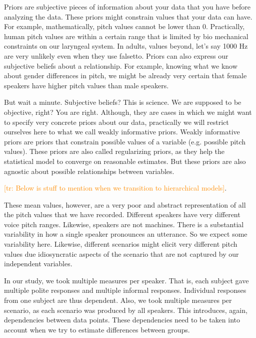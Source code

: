 \documentclass[nobib]{tufte-handout}
\newcommand{\tr}[1]{\textcolor{DarkOrange}{[tr: #1]}}
\begin{document}
Priors are subjective pieces of information about your data that you have before analyzing the data. These priors might constrain values that your data can have. For example, mathematically, pitch values  cannot be lower than 0. Practically, human pitch values are within a certain range that is limited by bio mechanical constraints on our laryngeal system. In adults, values beyond, let's say 1000 Hz are very unlikely even when they use falsetto.
Priors can also express our subjective beliefs about a relationship. For example, knowing what we know about gender differences in pitch, we might be already very certain that female speakers have higher pitch values than male speakers.

But wait a minute. Subjective beliefs? This is science. We are supposed to be objective, right? You are right. Although, they are cases in which we might want to specify very concrete priors about our data, practically we will restrict ourselves here to what we call weakly informative priors. Weakly informative priors are priors that constrain possible values of a variable (e.g. possible pitch values). These priors are also called regularizing priors, as they help the statistical model to converge on reasonable estimates. But these priors are also agnostic about possible relationships between variables. 



\tr{Below is stuff to mention when we transition to hierarchical models}. 

These mean values, however, are a very poor and abstract representation of all the pitch values that we have recorded. Different speakers have very different voice pitch ranges. Likewise, speakers are not machines. There is a substantial variability in how a single speaker pronounces an utterance. So we expect some variability here. Likewise,
different scenarios might elicit very different pitch values due idiosyncratic aspects of the scenario that are not captured by our independent variables. 

In our study, we took multiple measures per speaker. That is, each subject gave multiple polite responses and multiple informal responses. 
Individual responses from one subject are thus dependent. Also, we took multiple measures per scenario, as each scenario was produced by all speakers. This introduces, again, dependencies between data points. These dependencies need to be taken into account when we try to estimate differences between groups.


\newpage
\end{document}
